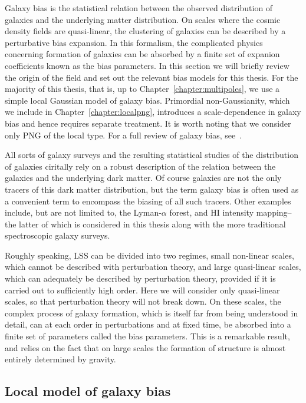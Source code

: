 Galaxy bias is the statistical relation between the observed distribution of galaxies and the underlying matter distribution. On scales where the cosmic density fields are quasi-linear, the clustering of galaxies can be described by a perturbative bias expansion. In this formalism, the complicated physics concerning formation of galaxies can be absorbed by a finite set of expanion coefficients known as the bias parameters. In this section we will briefly review the origin of the field and set out the relevant bias models for this thesis. For the majority of this thesis, that is, up to Chapter~\ref{chapter:multipoles}, we use a simple local Gaussian model of galaxy bias. Primordial non-Gaussianity, which we include in Chapter~\ref{chapter:localpng}, introduces a scale-dependence in galaxy bias and hence requires separate treatment. It is worth noting that we consider only PNG of the local type. For a full review of galaxy bias, see~\cite{Desjacques:2016bnm}.

All sorts of galaxy surveys and the resulting statistical studies of the distribution of galaxies ciritally rely on a robust description of the relation between the galaxies and the underlying dark matter. Of course galaxies are not the only tracers of this dark matter distribution, but the term galaxy bias is often used as a convenient term to encompass the biasing of all such tracers. Other examples include, but are not limited to, the Lyman-$\alpha$ forest, and HI intensity mapping-- the latter of which is considered in this thesis along with the more traditional spectroscopic galaxy surveys. 

Roughly speaking, LSS can be divided into two regimes, small non-linear scales, which cannot be described with perturbation theory, and large quasi-linear scales, which can adequately be described by perturbation theory, provided if it is carried out to sufficiently high order. Here we will consider only quasi-linear scales, so that perturbation theory will not break down. On these scales, the complex process of galaxy formation, which is itself far from being understood in detail, can at each order in perturbations and at fixed time, be absorbed into a finite set of parameters called the bias parameters. This is a remarkable result, and relies on the fact that on large scales the formation of structure is almost entirely determined by gravity. 

\subsection{Local model of galaxy bias}


